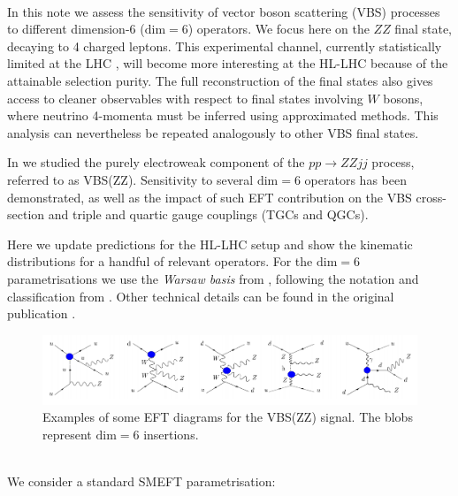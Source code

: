 \documentclass[../report.tex]{subfiles}
\begin{document}
\\
In this note we assess the sensitivity of vector boson scattering (VBS) processes to different dimension-6 ($\mathrm{dim=6}$) operators. We focus here on the $ZZ$ final state, decaying to 4 charged leptons. This experimental channel, currently statistically limited at the LHC \cite{Sirunyan:2017fvv}, will become more interesting at the HL-LHC because of the attainable selection purity. The full reconstruction of the final states also gives access to cleaner observables with respect to final states involving $W$ bosons, where neutrino 4-momenta must be inferred using approximated methods.
This analysis can nevertheless be repeated analogously to other VBS final states. 

In \cite{Gomez-Ambrosio:2018pnl} we studied the purely electroweak component of the $p p \to Z Z j j$ process, referred to as VBS(ZZ). Sensitivity to several $\mathrm{dim=6}$ operators has been demonstrated, as well as the impact of such EFT contribution on the VBS cross-section and triple and quartic gauge couplings (TGCs and QGCs). 

Here we update predictions for the HL-LHC setup and show the kinematic distributions for a handful of relevant operators. For the $\mathrm{dim=6}$ parametrisations we use the \emph{Warsaw basis} from \cite{Grzadkowski:2010es}, following the notation and classification from \cite{Jenkins:2013zja}. Other technical details can be found in the original publication \cite{Gomez-Ambrosio:2018pnl}.

\begin{figure}[h!]
\includegraphics[scale=0.3]{feynmandiagramssignal.png}
\caption{Examples of some EFT diagrams for the VBS(ZZ) signal. The blobs represent $\mathrm{dim=6}$ insertions.}
\end{figure}

\\
%
We consider a standard SMEFT parametrisation:
\end{document}
